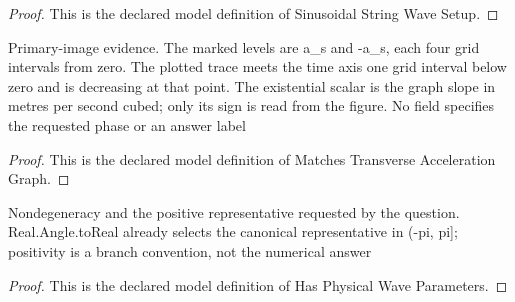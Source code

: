 \begin{proof}
  This is the declared model definition of Sinusoidal String Wave Setup.
\end{proof}
\begin{definition}
  \label{def:physics:phyx-mini-0302:phyxminiproblems-problemphyxmini0302-matchestransverseaccelerationgraph}
  Primary-image evidence. The marked levels are a\_s and -a\_s, each four grid intervals from zero. The plotted trace meets the time axis one grid interval below zero and is decreasing at that point. The existential scalar is the graph slope in metres per second cubed; only its sign is read from the figure. No field specifies the requested phase or an answer label
\end{definition}
\begin{proof}
  This is the declared model definition of Matches Transverse Acceleration Graph.
\end{proof}
\begin{definition}
  \label{def:physics:phyx-mini-0302:phyxminiproblems-problemphyxmini0302-hasphysicalwaveparameters}
  Nondegeneracy and the positive representative requested by the question. Real.Angle.toReal already selects the canonical representative in (-pi, pi]; positivity is a branch convention, not the numerical answer
\end{definition}
\begin{proof}
  This is the declared model definition of Has Physical Wave Parameters.
\end{proof}

